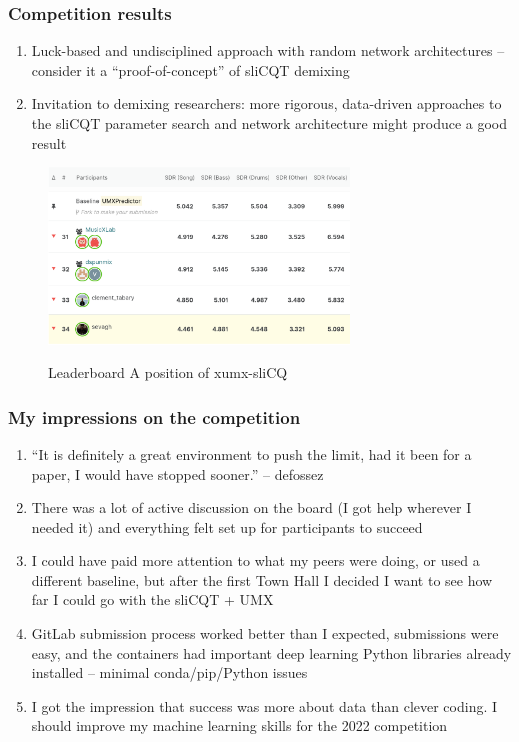 \documentclass[usenames,dvipsnames]{beamer}
\begin{document}
\begin{frame}
	\frametitle{Competition results}
	\begin{enumerate}
	\item
		Luck-based and undisciplined approach with random network architectures -- consider it a ``proof-of-concept'' of sliCQT demixing
	\item
		Invitation to demixing researchers: more rigorous, data-driven approaches to the sliCQT parameter search and network architecture might produce a good result
	\end{enumerate}
	\begin{figure}[ht]
		\centering
		\includegraphics[width=8cm]{./images-misc/leaderboard_header.png}\\
		\vspace{-0.25em}
		\includegraphics[width=8cm]{./images-misc/leaderboard_myplace.png}
		\caption{Leaderboard A position of xumx-sliCQ}
		\vspace{-1em}
	\end{figure}

\end{frame}

\begin{frame}
	\frametitle{My impressions on the competition}
	\begin{enumerate}
	\item
	 ``It is definitely a great environment to push the limit, had it been for a paper, I would have stopped sooner.'' -- defossez
	 \item
		 There was a lot of active discussion on the board (I got help wherever I needed it) and everything felt set up for participants to succeed
	 \item
		 I could have paid more attention to what my peers were doing, or used a different baseline, but after the first Town Hall I decided I want to see how far I could go with the sliCQT + UMX
	 \item
		 GitLab submission process worked better than I expected, submissions were easy, and the containers had important deep learning Python libraries already installed -- minimal conda/pip/Python issues
	 \item
		 I got the impression that success was more about data than clever coding. I should improve my machine learning skills for the 2022 competition
	\end{enumerate}
\end{frame}
\end{document}

